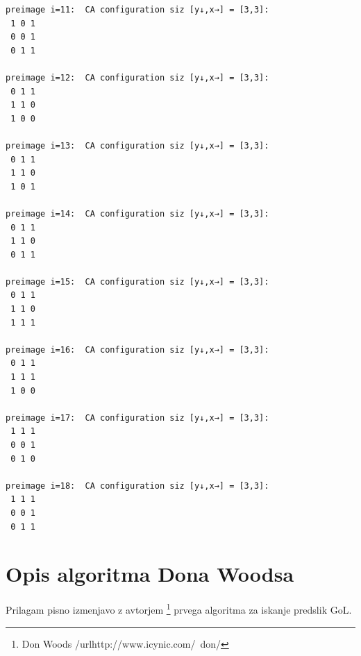 \documentclass[12pt,a4paper,openany,twoside]{book}
\begin{document}
\begin{verbatim}
preimage i=11:  CA configuration siz [y↓,x→] = [3,3]:
 1 0 1
 0 0 1
 0 1 1

preimage i=12:  CA configuration siz [y↓,x→] = [3,3]:
 0 1 1
 1 1 0
 1 0 0

preimage i=13:  CA configuration siz [y↓,x→] = [3,3]:
 0 1 1
 1 1 0
 1 0 1

preimage i=14:  CA configuration siz [y↓,x→] = [3,3]:
 0 1 1
 1 1 0
 0 1 1

preimage i=15:  CA configuration siz [y↓,x→] = [3,3]:
 0 1 1
 1 1 0
 1 1 1

preimage i=16:  CA configuration siz [y↓,x→] = [3,3]:
 0 1 1
 1 1 1
 1 0 0

preimage i=17:  CA configuration siz [y↓,x→] = [3,3]:
 1 1 1
 0 0 1
 0 1 0

preimage i=18:  CA configuration siz [y↓,x→] = [3,3]:
 1 1 1
 0 0 1
 0 1 1
\end{verbatim}


\chapter{Opis algoritma Dona Woodsa}
\label{woods}

Prilagam pisno izmenjavo z avtorjem \footnote{Don Woods /url{http://www.icynic.com/~don/}} prvega algoritma za iskanje predslik GoL.
\end{document}
